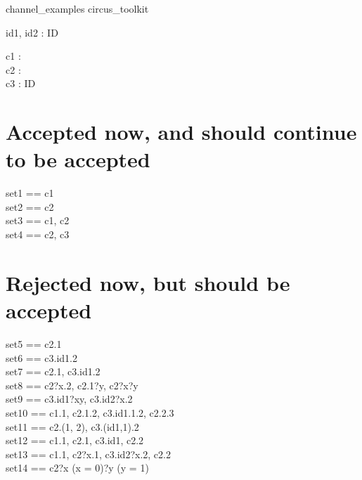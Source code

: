 \documentclass{article}
\begin{document}
\begin{zsection}
  \SECTION channel\_examples \parents circus\_toolkit
\end{zsection}

\begin{zed}
	[ID]
\end{zed}

\begin{axdef}
	id1, id2 : ID
\end{axdef}

\begin{circus}
	\circchannel c1 : \nat \\
	\circchannel c2 : \nat \cross \nat \\
	\circchannel c3 : ID \cross \nat \cross \nat
\end{circus}

\section{Accepted now, and should continue to be accepted}

\begin{circus}
	\circchannelset set1 == \lchanset c1 \rchanset \\
	\circchannelset set2 == \lchanset c2 \rchanset \\
	\circchannelset set3 == \lchanset c1, c2 \rchanset \\
	\circchannelset set4 == \lchanset c2, c3 \rchanset
\end{circus}

\section{Rejected now, but should be accepted}

\begin{circus}
	\circchannelset set5 == \lchanset c2.1 \rchanset \\
	\circchannelset set6 == \lchanset c3.id1.2 \rchanset \\
	\circchannelset set7 == \lchanset c2.1, c3.id1.2 \rchanset \\
	\circchannelset set8 == \lchanset c2?x.2, c2.1?y, c2?x?y \rchanset \\
	\circchannelset set9 == \lchanset c3.id1?xy, c3.id2?x.2 \rchanset \\
	\circchannelset set10 == \lchanset c1.1, c2.1.2, c3.id1.1.2, c2.2.3 \rchanset \\
	\circchannelset set11 == \lchanset c2.(1, 2), c3.(id1,1).2 \rchanset \\
	\circchannelset set12 == \lchanset c1.1, c2.1, c3.id1, c2.2 \rchanset \\
	\circchannelset set13 == \lchanset c1.1, c2?x.1, c3.id2?x.2, c2.2 \rchanset \\
	\circchannelset set14 == \lchanset c2?x \prefixcolon (x  = 0)?y \prefixcolon (y  = 1) \rchanset
\end{circus}
\end{document}
